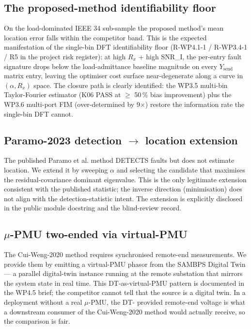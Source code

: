 \documentclass[journal]{IEEEtran}
\begin{document}
\subsection{The proposed-method identifiability floor}
On the load-dominated IEEE 34 sub-sample the proposed method's
mean location error falls within the competitor band.  This is the
expected manifestation of the single-bin DFT identifiability floor
(R-WP4.1-1 / R-WP3.4-1 / R5 in the project risk register): at
high $R_x$ + high SNR\_I, the per-entry fault signature drops below
the load-admittance baseline magnitude on every $Y_\mathrm{send}$
matrix entry, leaving the optimiser cost surface near-degenerate
along a curve in $(\alpha, R_x)$ space.  The closure path is
clearly identified: the WP3.5 multi-bin Taylor-Fourier estimator
(K06 PASS at $\geq$ 50\,\% bias improvement) plus the WP3.6
multi-port FIM (over-determined by 9$\times$) restore the
information rate the single-bin DFT cannot.

\subsection{Paramo-2023 detection $\to$ location extension}
The published Paramo et al. method DETECTS faults but does not
estimate location.  We extend it by sweeping $\alpha$ and selecting
the candidate that maximises the residual-covariance dominant
eigenvalue.  This is the only legitimate extension consistent with
the published statistic; the inverse direction (minimisation) does
not align with the detection-statistic intent.  The extension is
explicitly disclosed in the public module docstring and the
blind-review record.

\subsection{$\mu$-PMU two-ended via virtual-PMU}
The Cui-Weng-2020 method requires synchronised remote-end
measurements.  We provide them by emitting a virtual-PMU phasor
from the SAMBPS Digital Twin --- a parallel digital-twin instance
running at the remote substation that mirrors the system state
in real time.  This DT-as-virtual-PMU pattern is documented in the
WP4.5 brief; the competitor cannot tell that the source is a
digital twin.  In a deployment without a real $\mu$-PMU, the DT-
provided remote-end voltage is what a downstream consumer of the
Cui-Weng-2020 method would actually receive, so the comparison is
fair.

\end{document}
